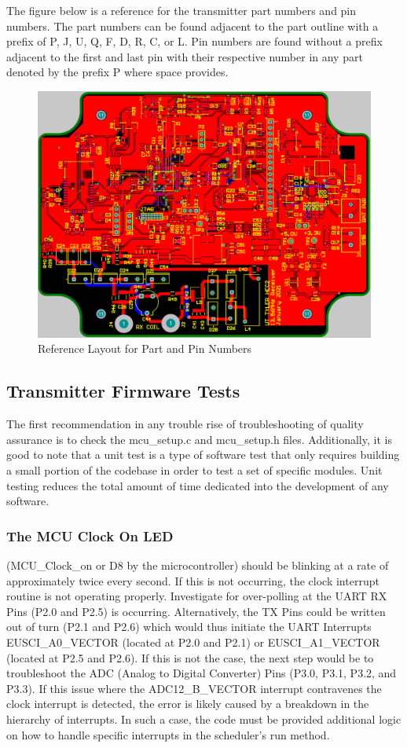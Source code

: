\documentclass[12pt]{article}
\begin{document}
\noindent
The figure below is a reference for the transmitter part numbers and pin numbers.  The part numbers can be found adjacent to the part outline with a prefix of P, J, U, Q, F, D, R, C, or L.  Pin numbers are found without a prefix adjacent to the first and last pin with their respective number in any part denoted by the prefix P where space provides.
\hfill
\begin{figure}[h!]
\centering
\includegraphics[width=0.8\linewidth]{receiver_pcb_layout}
\caption{Reference Layout for Part and Pin Numbers}
\end{figure}

\hfill
\pagebreak
\hfill 
\subsection{Transmitter Firmware Tests}

\indent \indent
The first recommendation in any trouble rise of troubleshooting of quality assurance is to check the mcu\_setup.c and mcu\_setup.h files.  Additionally, it is good to note that a unit test is a type of software test that only requires building a small portion of the codebase in order to test a set of specific modules.  Unit testing reduces the total amount of time dedicated into the development of any software.

\subsubsection*{The MCU Clock On LED} (MCU\_Clock\_on or D8 by the microcontroller) should be blinking at a rate of approximately twice every second.  If this is not occurring, the clock interrupt routine is not operating properly.  Investigate for over-polling at the UART RX Pins (P2.0 and P2.5) is occurring.  Alternatively, the TX Pins could be written out of turn (P2.1 and P2.6) which would thus initiate the UART Interrupts EUSCI\_A0\_VECTOR (located at P2.0 and P2.1) or EUSCI\_A1\_VECTOR (located at P2.5 and P2.6).  If this is not the case, the next step would be to troubleshoot the ADC (Analog to Digital Converter) Pins (P3.0, P3.1, P3.2, and P3.3).  If this issue where the ADC12\_B\_VECTOR interrupt contravenes the clock interrupt is detected, the error is likely caused by a breakdown in the hierarchy of interrupts.  In such a case, the code must be provided additional logic on how to handle specific interrupts in the scheduler’s run method.
\end{document}
